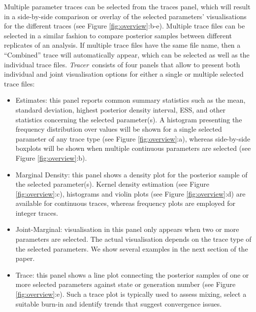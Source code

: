 \documentclass{bioinfo}
\newcommand{\tracer}{\emph{Tracer}}
\begin{document}
Multiple parameter traces can be selected from the traces panel, which will result in a side-by-side comparison or overlay of the selected parameters' visualisations for the different traces (see Figure \ref{fig:overview}:b-e).
Multiple trace files can be selected in a similar fashion to compare posterior samples between different replicates of an analysis.
If multiple trace files have the same file name,  then a ``Combined'' trace will automatically appear, which can be selected as well as the individual trace files.
\tracer\ consists of four panels that allow to present both individual and joint visualisation options for either a single or multiple selected trace files:

\begin{itemize}

\item Estimates: this panel reports common summary statistics such as the mean, standard deviation, highest posterior density interval, ESS, and other statistics concerning the selected parameter(s).
A histogram presenting the frequency distribution over values will be shown for a single selected parameter of any trace type (see Figure \ref{fig:overview}:a), whereas side-by-side boxplots will be shown when multiple continuous parameters are selected (see Figure \ref{fig:overview}:b).

\item Marginal Density: this panel shows a density plot for the posterior sample of the selected parameter(s). Kernel density estimation (see Figure \ref{fig:overview}:c), histograms and violin plots (see Figure \ref{fig:overview}:d) are available for continuous traces, whereas frequency plots are employed for integer traces.

\item Joint-Marginal: visualisation in this panel only appears when two or more parameters are selected. The actual visualisation depends on the trace type of the selected parameters. We show several examples in the next section of the paper.

\item Trace: this panel shows a line plot connecting the posterior samples of one or more selected parameters against state or generation number (see Figure \ref{fig:overview}:e). Such a trace plot is typically used to assess mixing, select a suitable burn-in and identify trends that suggest convergence issues.

\end{itemize}
\end{document}

